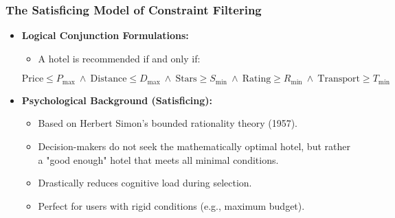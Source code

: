 \begin{frame}
    \frametitle{The Satisficing Model of Constraint Filtering}
    \begin{itemize}
        \item \textbf{Logical Conjunction Formulations:}
            \begin{itemize}
                \item A hotel is recommended if and only if:
            \end{itemize}
            \begin{equation*}
              \text{Price} \le P_{\max} \ \land \ \text{Distance} \le D_{\max} \ \land \ \text{Stars} \ge S_{\min} \ \land \ \text{Rating} \ge R_{\min} \ \land \ \text{Transport} \ge T_{\min}
            \end{equation*}
        \item \textbf{Psychological Background (Satisficing):}
            \begin{itemize}
                \item Based on Herbert Simon's bounded rationality theory (1957).
                \item Decision-makers do not seek the mathematically optimal hotel, but rather a "good enough" hotel that meets all minimal conditions.
                \item Drastically reduces cognitive load during selection.
                \item Perfect for users with rigid conditions (e.g., maximum budget).
            \end{itemize}
    \end{itemize}
\end{frame}

